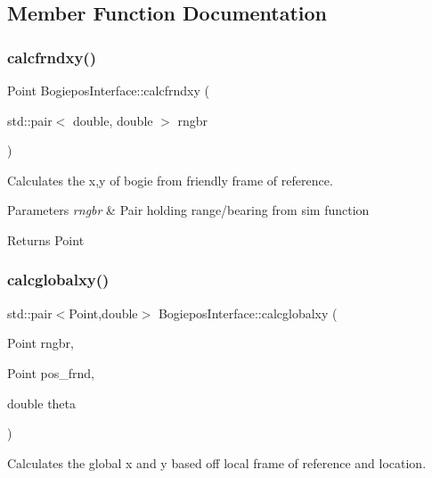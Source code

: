 \subsection{Member Function Documentation}
\mbox{\label{classBogieposInterface_abdbf2caf087cb39dcf35700ecf9128bd}} 
\subsubsection{\texorpdfstring{calcfrndxy()}{calcfrndxy()}}
{\footnotesize\ttfamily Point Bogiepos\+Interface\+::calcfrndxy (\begin{DoxyParamCaption}\item[{std\+::pair$<$ double, double $>$}]{rngbr }\end{DoxyParamCaption})}



Calculates the x,y of bogie from friendly frame of reference. 


\begin{DoxyParams}{Parameters}
{\em rngbr} & Pair holding range/bearing from sim function \\
\hline
\end{DoxyParams}
\begin{DoxyReturn}{Returns}
Point 
\end{DoxyReturn}
\mbox{\label{classBogieposInterface_a0d6962250b64da519be1e8ac46a7afa7}} 
\subsubsection{\texorpdfstring{calcglobalxy()}{calcglobalxy()}}
{\footnotesize\ttfamily std\+::pair$<$Point,double$>$ Bogiepos\+Interface\+::calcglobalxy (\begin{DoxyParamCaption}\item[{Point}]{rngbr,  }\item[{Point}]{pos\+\_\+frnd,  }\item[{double}]{theta }\end{DoxyParamCaption})}



Calculates the global x and y based off local frame of reference and location. 


